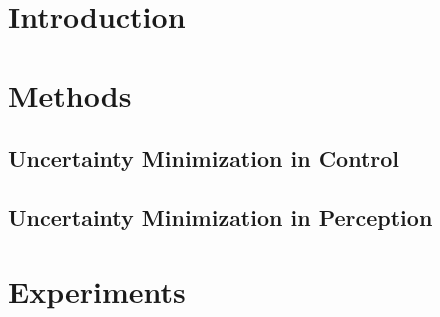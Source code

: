\documentclass[conference]{IEEEtran}
\begin{document}
\section{Introduction}


\section{Methods}
\subsection{Uncertainty Minimization in Control}

\subsection{Uncertainty Minimization in Perception}



\section{Experiments \label{sec:exp}}






\addtolength{\textheight}{0 cm}   %







\hypersetup{
    urlcolor = .,
}

%


%
\end{document}
